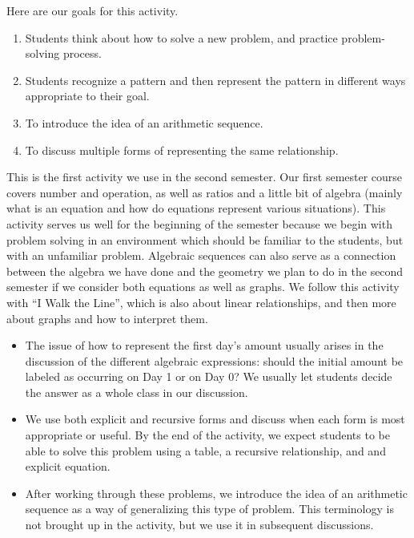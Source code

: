 \documentclass{ximera}
\begin{document}
\begin{instructorNotes}
Here are our goals for this activity.
\begin{enumerate}
\item Students think about how to solve a new problem, and practice problem-solving process.
\item  Students recognize a pattern and then represent the pattern in different ways appropriate to their goal.
\item  To introduce the idea of an arithmetic sequence.
\item To discuss multiple forms of representing the same relationship. 
\end{enumerate}

This is the first activity we use in the second semester.  Our first semester course covers number and operation, as well as ratios and a little bit of algebra (mainly what is an equation and how do equations represent various situations).  This activity serves us well for the beginning of the semester because we begin with problem solving in an environment which should be familiar to the students, but with an unfamiliar problem.  Algebraic sequences can also serve as a connection between the algebra we have done and the geometry we plan to do in the second semester if we consider both equations as well as graphs.  We follow this activity with ``I Walk the Line'', which is also about linear relationships, and then more about graphs and how to interpret them. 

\begin{itemize}
\item The issue of how to represent the first day's amount usually arises in the discussion of the different algebraic expressions:  should the initial amount be labeled as occurring on Day 1 or on Day 0? We usually let students decide the answer as a whole class in our discussion.
\item We use both explicit and recursive forms and discuss when each form is most appropriate or useful.  By the end of the activity, we expect students to be able to solve this problem using a table, a recursive relationship, and and explicit equation.
\item After working through these problems, we introduce the idea of an arithmetic sequence as a way of generalizing this type of problem.  This terminology is not brought up in the activity, but we use it in subsequent discussions.
\end{itemize}

\end{instructorNotes}
\end{document}
